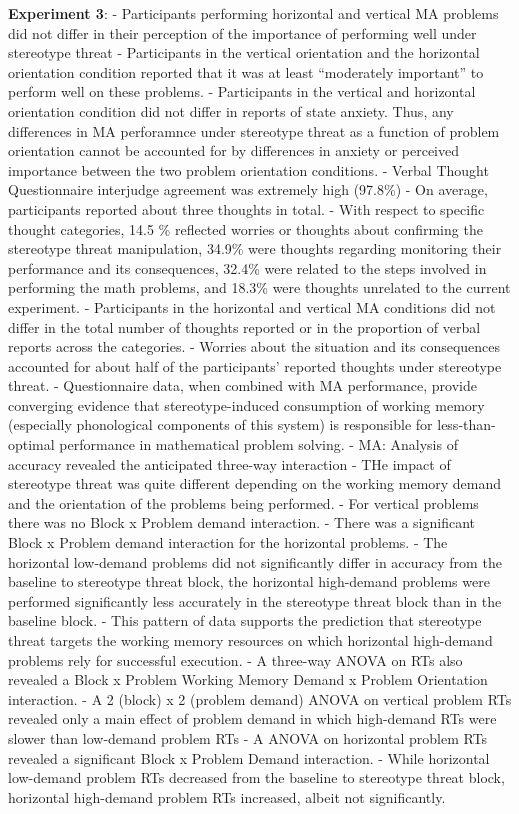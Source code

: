 \documentclass[
  doc, a4paper]{apa7}
\begin{document}
\textbf{Experiment 3}:
- Participants performing horizontal and vertical MA problems did not differ in their perception of the importance of performing well under stereotype threat
- Participants in the vertical orientation and the horizontal orientation condition reported that it was at least ``moderately important'' to perform well on these problems.
- Participants in the vertical and horizontal orientation condition did not differ in reports of state anxiety. Thus, any differences in MA perforamnce under stereotype threat as a function of problem orientation cannot be accounted for by differences in anxiety or perceived importance between the two problem orientation conditions.
- Verbal Thought Questionnaire interjudge agreement was extremely high (97.8\%)
- On average, participants reported about three thoughts in total.
- With respect to specific thought categories, 14.5 \% reflected worries or thoughts about confirming the stereotype threat manipulation, 34.9\% were thoughts regarding monitoring their performance and its consequences, 32.4\% were related to the steps involved in performing the math problems, and 18.3\% were thoughts unrelated to the current experiment.
- Participants in the horizontal and vertical MA conditions did not differ in the total number of thoughts reported or in the proportion of verbal reports across the categories.
- Worries about the situation and its consequences accounted for about half of the participants' reported thoughts under stereotype threat.
- Questionnaire data, when combined with MA performance, provide converging evidence that stereotype-induced consumption of working memory (especially phonological components of this system) is responsible for less-than-optimal performance in mathematical problem solving.
- MA: Analysis of accuracy revealed the anticipated three-way interaction
- THe impact of stereotype threat was quite different depending on the working memory demand and the orientation of the problems being performed.
- For vertical problems there was no Block x Problem demand interaction.
- There was a significant Block x Problem demand interaction for the horizontal problems.
- The horizontal low-demand problems did not significantly differ in accuracy from the baseline to stereotype threat block, the horizontal high-demand problems were performed significantly less accurately in the stereotype threat block than in the baseline block.
- This pattern of data supports the prediction that stereotype threat targets the working memory resources on which horizontal high-demand problems rely for successful execution.
- A three-way ANOVA on RTs also revealed a Block x Problem Working Memory Demand x Problem Orientation interaction.
- A 2 (block) x 2 (problem demand) ANOVA on vertical problem RTs revealed only a main effect of problem demand in which high-demand RTs were slower than low-demand problem RTs
- A ANOVA on horizontal problem RTs revealed a significant Block x Problem Demand interaction.
- While horizontal low-demand problem RTs decreased from the baseline to stereotype threat block, horizontal high-demand problem RTs increased, albeit not significantly.
\end{document}
